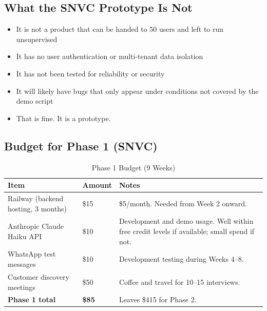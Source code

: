 \documentclass[12pt, a4paper]{article}
\begin{document}
\subsection{What the SNVC Prototype Is Not}

\begin{itemize}[leftmargin=1.5em, itemsep=0.3em]
    \item It is not a product that can be handed to 50 users and left to run unsupervised
    \item It has no user authentication or multi-tenant data isolation
    \item It has not been tested for reliability or security
    \item It will likely have bugs that only appear under conditions not covered by the demo script
    \item That is fine. It is a prototype.
\end{itemize}

\subsection{Budget for Phase 1 (SNVC)}

\begin{table}[ht]
\centering
\caption{Phase 1 Budget (9 Weeks)}
\renewcommand{\arraystretch}{1.4}
\begin{tabularx}{\textwidth}{X p{2cm} X}
\toprule
\rowcolor{pollitylightblue}
\textbf{Item} & \textbf{Amount} & \textbf{Notes} \\
\midrule
Railway (backend hosting, 3 months)  & \$15  & \$5/month. Needed from Week 2 onward. \\
Anthropic Claude Haiku API           & \$10  & Development and demo usage. Well within free credit levels if available; small spend if not. \\
WhatsApp test messages               & \$10  & Development testing during Weeks 4--8. \\
Customer discovery meetings          & \$50  & Coffee and travel for 10--15 interviews. \\
\midrule
\rowcolor{lightgreen}
\textbf{Phase 1 total}               & \textbf{\$85} & Leaves \$415 for Phase 2. \\
\bottomrule
\end{tabularx}
\end{table}

\newpage

\end{document}
